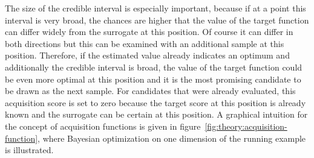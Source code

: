 The size of the credible interval is especially important, because if at a point this interval is very broad, the chances are higher that the value of the target function can differ widely from the surrogate at this position.
Of course it can differ in both directions but this can be examined with an additional sample at this position.
Therefore, if the estimated value already indicates an optimum and additionally the credible interval is broad, the value of the target function could be even more optimal at this position and it is the most promising candidate to be drawn as the next sample.
For candidates that were already evaluated, this acquisition score is set to zero because the target score at this position is already known and the surrogate can be certain at this position.
A graphical intuition for the concept of acquisition functions is given in figure~\ref{fig:theory:acquisition-function}, where Bayesian optimization on one dimension of the running example is illustrated.
